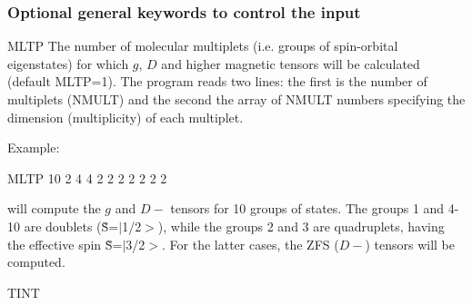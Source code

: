 \subsubsection{Optional general keywords to control the input}
\begin{keywordlist}






\item[MLTP]
The number of molecular multiplets (i.e. groups of spin-orbital eigenstates) for which
$g$, $D$ and higher magnetic tensors will be calculated (default MLTP=1).
The program reads two lines: the first is the number of multiplets (NMULT) and the
second the array of NMULT numbers specifying the dimension (multiplicity) of each multiplet.

Example:
\begin{inputlisting}
MLTP
10
2 4 4 2 2   2 2 2 2 2
\end{inputlisting}
 will compute the $g$ and $D-$ tensors for 10 groups of states.
The groups 1 and 4-10 are doublets (\~{S}=$|$1/2$>$), while the groups 2 and 3 are quadruplets,
having the effective spin \~{S}=$|$3/2$>$. For the latter cases, the ZFS ($D-$) tensors will be computed.






\item[TINT]


\end{keywordlist}
